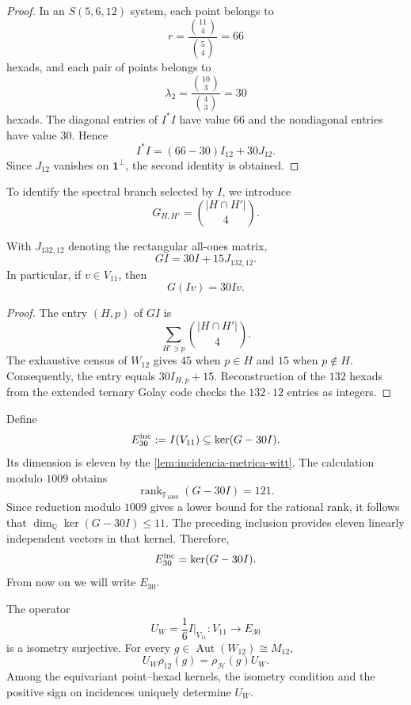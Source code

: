 \begin{proof}
In an \(S(5,6,12)\) system, each point belongs to
\[
 r=\frac{\binom{11}{4}}{\binom54}=66
\]
hexads, and each pair of points belongs to
\[
 \lambda_2=\frac{\binom{10}{3}}{\binom43}=30
\]
hexads. The diagonal entries of \(I^*I\) have value \(66\) and the
nondiagonal entries have value \(30\). Hence
\[
 I^*I=(66-30)I_{12}+30J_{12}.
\]
Since \(J_{12}\) vanishes on \(\mathbf1^\perp\), the second
identity is obtained.
\end{proof}

To identify the spectral branch selected by \(I\), we introduce
\[
 G_{H,H'}=\binom{|H\cap H'|}{4}.
\]

\begin{lemma}
\label{lem:incidencia-espectral-witt}
With \(J_{132,12}\) denoting the rectangular all-ones matrix,
\[
 \boxed{GI=30I+15J_{132,12}.}
\]
In particular, if \(v\in V_{11}\), then
\[
 G(Iv)=30Iv.
\]
\end{lemma}

\begin{proof}
The entry \((H,p)\) of \(GI\) is
\[
 \sum_{H'\ni p}\binom{|H\cap H'|}{4}.
\]
The exhaustive census of \(W_{12}\) gives \(45\) when \(p\in H\) and \(15\)
when \(p\notin H\). Consequently, the entry equals
\(30I_{H,p}+15\). Reconstruction of the \(132\) hexads from the extended ternary
Golay code checks the \(132\cdot12\) entries as
integers.
\end{proof}

Define
\[
 E_{30}^{\rm inc}:=I(V_{11})\subseteq\ker(G-30I).
\]
Its dimension is eleven by the \cref{lem:incidencia-metrica-witt}. The calculation
modulo \(1009\) obtains
\[
 \operatorname{rank}_{\mathbb F_{1009}}(G-30I)=121.
\]
Since reduction modulo \(1009\) gives a lower bound for the rational
rank, it follows that
\(\dim_{\mathbb Q}\ker(G-30I)\le11\). The preceding inclusion provides
eleven linearly independent vectors in that kernel. Therefore,
\[
 E_{30}^{\rm inc}=\ker(G-30I).
\]
From now on we will write \(E_{30}\).

\begin{theorem}
\label{thm:entrelazador-dodecafase-witt}
The operator
\[
 \boxed{
 U_W=\frac16 I\big|_{V_{11}}:V_{11}\longrightarrow E_{30}
 }
\]
is a isometry surjective. For every
\(g\in\operatorname{Aut}(W_{12})\cong M_{12}\),
\[
 U_W\rho_{12}(g)=\rho_{\mathcal H}(g)U_W.
\]
Among the equivariant point--hexad kernels, the isometry condition and
the positive sign on incidences uniquely determine \(U_W\).
\end{theorem}

